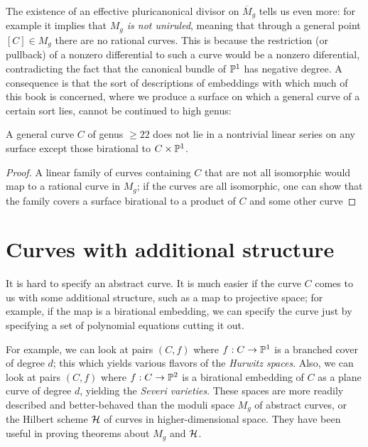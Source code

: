 The existence of an effective pluricanonical divisor on $\overline M_g$ tells us even more: for example it implies that \emph{$M_g$ is not uniruled}, meaning that through a general point $[C] \in M_g$ there are no rational curves. This is because the restriction (or pullback) of a nonzero differential to such a curve would be a nonzero diferential, contradicting the fact that the canonical bundle of ${\mathbb P}^1$ has  negative degree. A consequence is that the sort of descriptions of embeddings with which much of this book is concerned, where we produce a surface on which a general curve of a certain sort lies, cannot be continued to high genus:

\begin{corollary}
 A general curve $C$ of  genus $\geq 22$ does not lie in a nontrivial linear series on any surface
 except those birational to $C\times {\mathbb P}^1$.
\end{corollary}
\begin{proof}
 A linear family of curves containing $C$ that are not all isomorphic would map to a rational curve in $M_g$; if the curves are all isomorphic, one can show that the family
 covers a surface birational to a product of $C$ and some other curve 
\end{proof}


\section{Curves with additional structure}

It is hard to specify an abstract curve. It is much easier if the curve $C$ comes to us with some additional structure, such as a map to projective space; for example, if the map is a birational embedding, we can specify the curve just by specifying a set of polynomial equations cutting it out. 

For example, we can look at pairs $(C,f)$ where $f : C \to {\mathbb P}^1$ is a branched cover of degree $d$; this which yields various flavors of the \emph{Hurwitz spaces}.
Also, we can look at pairs $(C,f)$ where $f : C \to {\mathbb P}^2$ is a birational embedding of $C$ as a plane curve of degree $d$, yielding the \emph{Severi varieties}. These spaces are more readily described and better-behaved than the moduli space $M_g$ of abstract curves, or the Hilbert scheme ${\cal H}$ of curves in higher-dimensional space. They have been useful in proving theorems about $M_g$ and ${\cal H}$.

